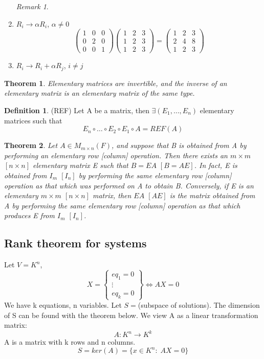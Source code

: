 \documentclass[12pt]{article}
\newtheorem{theorem}{Theorem}[section]
\theoremstyle{definition}
\newtheorem{definition}{Definition}[section]
\theoremstyle{remark}
\newtheorem*{remark}{Remark}
\begin{document}
\begin{example}
\begin{enumerate}
\begin{remark}
    \end{remark}
    \item $R_i \rightarrow \alpha R_i$, $\alpha \neq 0$
    $$\begin{pmatrix}
        1&0&0 \\ 0&2&0 \\ 0&0&1 
    \end{pmatrix}
    \begin{pmatrix}
        1&2&3 \\ 1&2&3\\1&2&3 
    \end{pmatrix} = 
    \begin{pmatrix}
        1&2&3 \\2&4&8\\1&2&3
    \end{pmatrix}$$
    \item $R_i \rightarrow R_i + \alpha R_j$, $i \neq j$
\end{enumerate}
\end{example}
    \begin{theorem}
        Elementary matrices are invertible, and the inverse of an
elementary matrix is an elementary matrix of the same type.
    \end{theorem}
\begin{definition}(REF)
    Let A be a matrix, then $\exists (E_1, \hdots , E_n)$ elementary matrices such that 
    $$E_n \circ \hdots \circ E_2\circ E_1 \circ A = REF(A)$$
\end{definition}

\begin{theorem}
    Let $A \in M_{m\times n}(F)$, and suppose that B is obtained from A by performing an elementary 
    row [column] operation. Then there exists an $m \times m$ $[n \times n]$ elementary matrix E such that 
    $B =EA$ $[B = AE]$. In fact, E is obtained from $I_m$ $[I_n]$ by performing the same elementary row [column]
     operation as that which was performed on A to obtain B. Conversely, if E is an elementary $m \times m$ $[n \times n]$
      matrix, then $EA$ $[AE]$ is the matrix obtained from A by performing the same elementary row [column] operation 
      as that which produces E from $I_m$ $[I_n]$.
\end{theorem}

\subsection{Rank theorem for systems}
Let $V = K^n$, 
$$X = \left\{\begin{matrix}
    eq_1 = 0 \\ \vdots \\ eq_k = 0 
\end{matrix} \right\} \iff AX = 0$$
We have k equations, n variables. Let $S = $(subspace of solutions). The dimension of S can be found with the theorem below. 
We view A as a linear transformation matrix:
$$A : K^n \rightarrow K^k$$
A is a matrix with k rows and n columns. 
$$S = ker(A) = \{x \in K^n :\; AX =0\}$$
\end{document}
